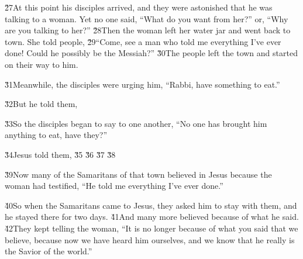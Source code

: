 \v{27}At this point his disciples arrived, and they were astonished that he was talking to a woman. Yet no one said, ``What do you want from her?'' or, ``Why are you talking to her?'' \v{28}Then the woman left her water jar and went back to town. She told people, \v{29}``Come, see a man who told me everything I've ever done! Could he possibly be the Messiah?'' \v{30}The people left the town and started on their way to him.

\v{31}Meanwhile, the disciples were urging him, ``Rabbi, have something to eat.''

\v{32}But he told them, 

\v{33}So the disciples began to say to one another, ``No one has brought him anything to eat, have they?''

\v{34}Jesus told them,  \v{35}  \v{36} \v{37} \v{38}

\v{39}Now many of the Samaritans of that town believed in Jesus because the woman had testified, ``He told me everything I've ever done.''

\v{40}So when the Samaritans came to Jesus, they asked him to stay with them, and he stayed there for two days. \v{41}And many more believed because of what he said. \v{42}They kept telling the woman, ``It is no longer because of what you said that we believe, because now we have heard him ourselves, and we know that he really is the Savior of the world.''

